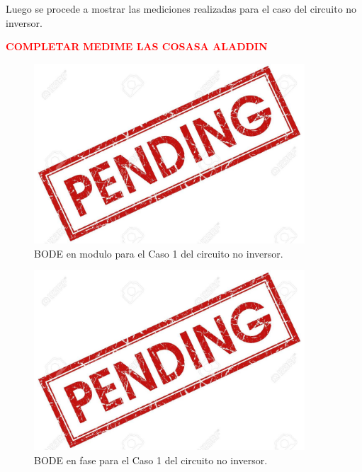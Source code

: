 Luego se procede a mostrar las mediciones realizadas para el caso del circuito no inversor.

\begin{center}
\textcolor{red}{\textbf{COMPLETAR}}
\textcolor{red}{\textbf{MEDIME LAS COSASA ALADDIN}}
\end{center}

\begin{figure}[H]	
	\centering
	\includegraphics[width=0.9\textwidth]{ImagenesAux/pend.jpg}
	\caption{BODE en modulo para el Caso 1 del circuito no inversor.}
	\label{fig:NoInvCompZinC1}
\end{figure} 

\begin{figure}[H]	
	\centering
	\includegraphics[width=0.9\textwidth]{ImagenesAux/pend.jpg}
	\caption{BODE en fase para el Caso 1 del circuito no inversor.}
	\label{fig:NoInvCompZinphC1}
\end{figure} 

